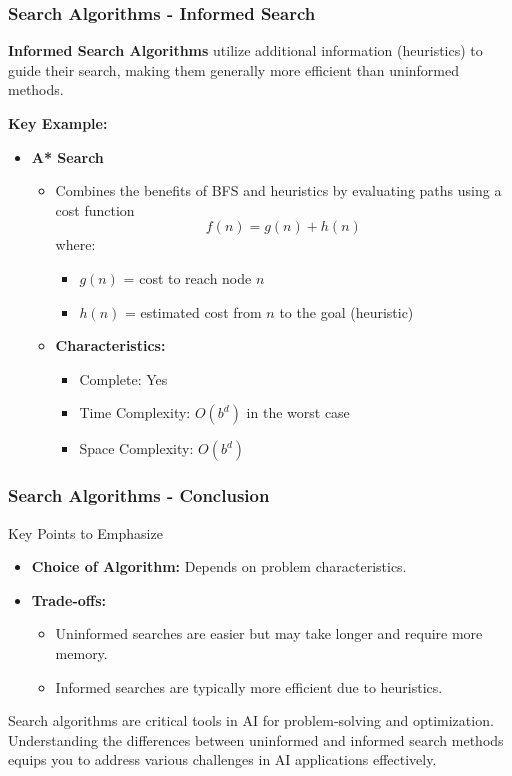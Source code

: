 \documentclass[aspectratio=169]{beamer}
\begin{document}
\begin{frame}[fragile]
    \frametitle{Search Algorithms - Informed Search}
    \textbf{Informed Search Algorithms} utilize additional information (heuristics) to guide their search, making them generally more efficient than uninformed methods.

    \textbf{Key Example:}
    
    \begin{itemize}
        \item \textbf{A* Search}
        \begin{itemize}
            \item Combines the benefits of BFS and heuristics by evaluating paths using a cost function 
            \[
            f(n) = g(n) + h(n)
            \]
            where:
            \begin{itemize}
                \item $g(n)$ = cost to reach node \(n\)
                \item $h(n)$ = estimated cost from \(n\) to the goal (heuristic)
            \end{itemize}
            \item \textbf{Characteristics:}
            \begin{itemize}
                \item Complete: Yes
                \item Time Complexity: $O(b^d)$ in the worst case
                \item Space Complexity: $O(b^d)$
            \end{itemize}
        \end{itemize}
    \end{itemize}
\end{frame}

\begin{frame}[fragile]
    \frametitle{Search Algorithms - Conclusion}
    \begin{block}{Key Points to Emphasize}
        \begin{itemize}
            \item \textbf{Choice of Algorithm:} Depends on problem characteristics.
            \item \textbf{Trade-offs:} 
            \begin{itemize}
                \item Uninformed searches are easier but may take longer and require more memory.
                \item Informed searches are typically more efficient due to heuristics.
            \end{itemize}
        \end{itemize}
    \end{block}

    Search algorithms are critical tools in AI for problem-solving and optimization. Understanding the differences between uninformed and informed search methods equips you to address various challenges in AI applications effectively. 
\end{frame}
\end{document}
